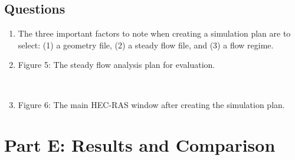 \documentclass[]{article}
\newcommand\setItemnumber[1]{\setcounter{enumi}{\numexpr#1-1\relax}}
\begin{document}
\subsection{Questions} \vspace{0.25cm}
\begin{enumerate}[label=\textbf{\arabic*.}] 
	\setItemnumber{8}
	\item The three important factors to note when creating a simulation plan are to select: (1) a geometry file, (2) a steady flow file, and (3) a flow regime. \\
	\setItemnumber{9}
	\item \begin{minipage}[t]{\linewidth}
		\raggedright
		
		\medskip
		\begin{center} 
			Figure 5: The steady flow analysis plan for evaluation.
		\end{center}
	\end{minipage} \\
	\setItemnumber{10}
\item \begin{minipage}[t]{\linewidth}
	\raggedright
	
	\medskip
	\begin{center} 
		Figure 6: The main HEC-RAS window after creating the simulation plan.
	\end{center}
\end{minipage}
\end{enumerate}
\newpage
\section{Part E: Results and Comparison}
\noindent 
\end{document}
